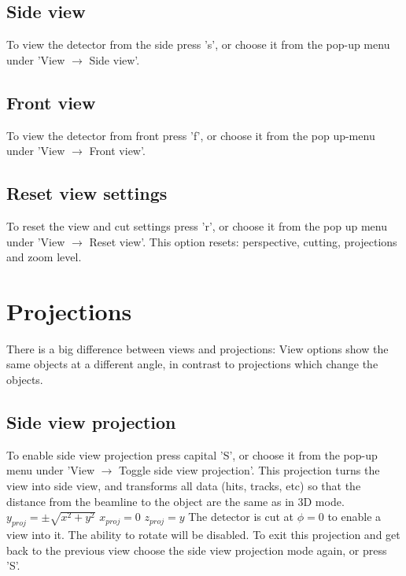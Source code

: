 \documentclass[a4paper,10pt]{article}
\begin{document}
\subsection{Side view}
To view the detector from the side press 's', or choose it from the pop-up menu under 'View $\rightarrow$ Side view'.

\subsection{Front view}
To view the detector from front press 'f', or choose it from the pop up-menu under 'View $\rightarrow$ Front view'.

\subsection{Reset view settings}
To reset the view and cut settings press 'r', or choose it from the pop up menu under 'View $\rightarrow$ Reset view'. This option resets: perspective, cutting, projections and zoom level.

\section{Projections}
There is a big difference between views and projections: View options show the same objects at a different angle, in contrast to projections which change the objects. 

\subsection{Side view projection}
To enable side view projection press capital 'S', or choose it from the pop-up menu under 'View $\rightarrow$ Toggle side view projection'. This projection turns the view into side view, and transforms all data (hits, tracks, etc) so that the distance from the beamline to the object are the same as in 3D mode.
\newline\newline
$y_{proj} = \pm \sqrt{x^2 + y^2}$\newline
$x_{proj}=0$\newline
$z_{proj} = y$ \newline
\newline
The detector is cut at $\phi=0$ to enable a view into it. The ability to rotate will be disabled. To exit this projection and get back to the previous view choose the side view projection mode again, or press 'S'. 
\end{document}
